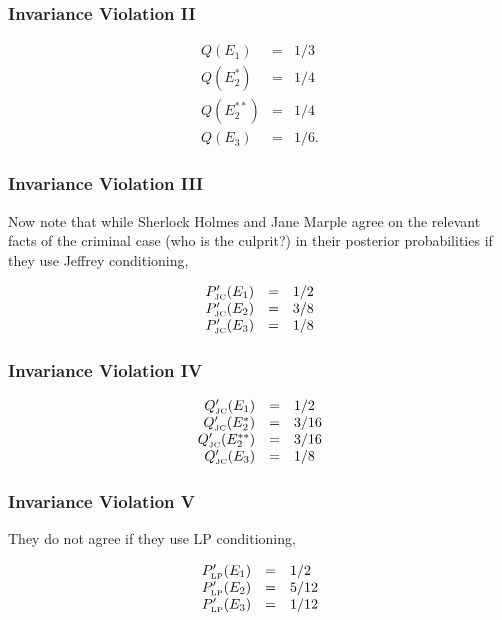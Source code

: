 \documentclass[xcolor=dvipsnames]{beamer}
\begin{document}
\begin{frame}
  \frametitle{Invariance Violation II}
\begin{equation}
  \label{eq:marpleprior}
  \begin{array}{rcl}
  Q(E_{1})&=&1/3\\
  Q(E_{2}^{*})&=&1/4\\
  Q(E_{2}^{**})&=&1/4\\
  Q(E_{3})&=&1/6.
\end{array}
\end{equation}
\end{frame}

\begin{frame}
  \frametitle{Invariance Violation III}
Now note that while Sherlock Holmes and Jane Marple agree on the
relevant facts of the criminal case (who is the culprit?) in their
posterior probabilities if they use Jeffrey conditioning,

\begin{equation}
  \label{eq:sherlockposteriorjc}
  \begin{array}{rcl}
  P'_{\mbox{\tiny JC}}(E_{1})&=&1/2\\
  P'_{\mbox{\tiny JC}}(E_{2})&=&3/8\\
  P'_{\mbox{\tiny JC}}(E_{3})&=&1/8
\end{array}
\end{equation}
\end{frame}

\begin{frame}
  \frametitle{Invariance Violation IV}
\begin{equation}
  \label{eq:marpleposteriorjc}
  \begin{array}{rcl}
  Q'_{\mbox{\tiny JC}}(E_{1})&=&1/2\\
  Q'_{\mbox{\tiny JC}}(E_{2}^{*})&=&3/16\\
  Q'_{\mbox{\tiny JC}}(E_{2}^{**})&=&3/16\\
  Q'_{\mbox{\tiny JC}}(E_{3})&=&1/8
\end{array}
\end{equation}
\end{frame}

\begin{frame}
  \frametitle{Invariance Violation V}
They do not agree if they use LP conditioning,

\begin{equation}
  \label{eq:sherlockposteriorlp}
  \begin{array}{rcl}
  P'_{\mbox{\tiny LP}}(E_{1})&=&1/2\\
  P'_{\mbox{\tiny LP}}(E_{2})&=&5/12\\
  P'_{\mbox{\tiny LP}}(E_{3})&=&1/12
\end{array}
\end{equation}
\end{frame}
\end{document}
